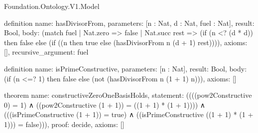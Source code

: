 \begin{lexlean}{Foundation.Ontology.V1.Model}
\begin{semanticmodule}
definition{
  name: hasDivisorFrom,
  parameters: [n : Nat, d : Nat, fuel : Nat],
  result: Bool,
  body: (match fuel
    | Nat.zero => false
    | Nat.succ rest =>
        (if (n <? (d * d))
          then false
          else (if ((n %
            then true
            else (hasDivisorFrom n (d + 1) rest)))),
  axioms: [],
  recursive_argument: fuel
}

definition{
  name: isPrimeConstructive,
  parameters: [n : Nat],
  result: Bool,
  body: (if (n <=? 1)
    then false
    else (not (hasDivisorFrom n (1 + 1) n))),
  axioms: []
}

theorem{
  name: constructiveZeroOneBasisHolds,
  statement: ((((pow2Constructive 0) = 1)
    ∧ ((pow2Constructive (1 + 1)) = ((1 + 1) * (1 + 1))))
    ∧ (((isPrimeConstructive (1 + 1)) = true)
      ∧ ((isPrimeConstructive ((1 + 1) * (1 + 1))) = false))),
  proof: decide{},
  axioms: []
}

\end{semanticmodule}
\end{lexlean}
